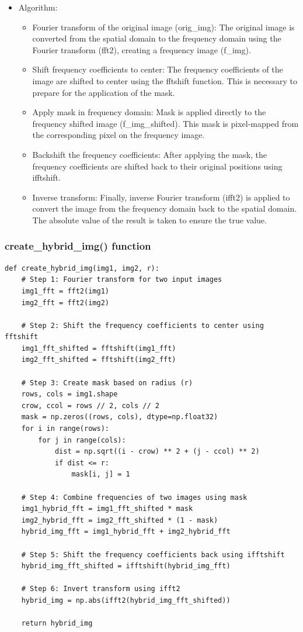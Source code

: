 \documentclass{article}
\begin{document}
\begin{itemize}
    
    \item Algorithm:
    \begin{itemize}
        \item Fourier transform of the original image (orig\_img): The original image is converted from the spatial domain to the frequency domain using the Fourier transform (fft2), creating a frequency image (f\_img).
        \item Shift frequency coefficients to center: The frequency coefficients of the image are shifted to center using the fftshift function. This is necessary to prepare for the application of the mask.
        \item Apply mask in frequency domain: Mask is applied directly to the frequency shifted image (f\_img\_shifted). This mask is pixel-mapped from the corresponding pixel on the frequency image.
        \item Backshift the frequency coefficients: After applying the mask, the frequency coefficients are shifted back to their original positions using ifftshift.
        \item Inverse transform: Finally, inverse Fourier transform (ifft2) is applied to convert the image from the frequency domain back to the spatial domain. The absolute value of the result is taken to ensure the true value.
    \end{itemize}
\end{itemize}


\subsubsection{create\_hybrid\_img() function}
\begin{lstlisting}[caption={Code of reate\_hybrid\_img() function}, label={reate\_hybrid\_img()}]
def create_hybrid_img(img1, img2, r):
    # Step 1: Fourier transform for two input images
    img1_fft = fft2(img1)
    img2_fft = fft2(img2)

    # Step 2: Shift the frequency coefficients to center using fftshift
    img1_fft_shifted = fftshift(img1_fft)
    img2_fft_shifted = fftshift(img2_fft)

    # Step 3: Create mask based on radius (r)
    rows, cols = img1.shape
    crow, ccol = rows // 2, cols // 2
    mask = np.zeros((rows, cols), dtype=np.float32)
    for i in range(rows):
        for j in range(cols):
            dist = np.sqrt((i - crow) ** 2 + (j - ccol) ** 2)
            if dist <= r:
                mask[i, j] = 1

    # Step 4: Combine frequencies of two images using mask
    img1_hybrid_fft = img1_fft_shifted * mask
    img2_hybrid_fft = img2_fft_shifted * (1 - mask)
    hybrid_img_fft = img1_hybrid_fft + img2_hybrid_fft

    # Step 5: Shift the frequency coefficients back using ifftshift
    hybrid_img_fft_shifted = ifftshift(hybrid_img_fft)

    # Step 6: Invert transform using ifft2
    hybrid_img = np.abs(ifft2(hybrid_img_fft_shifted))

    return hybrid_img
\end{lstlisting}
\end{document}
